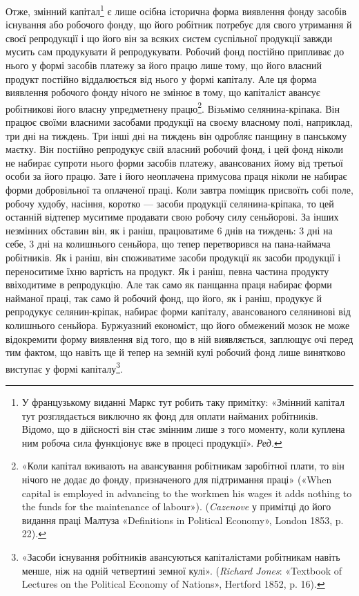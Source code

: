 Отже, змінний капітал\footnote*{
У французькому виданні Маркс тут робить таку примітку: «Змінний
капітал тут розглядається виключно як фонд для оплати найманих
робітників. Відомо, що в дійсності він стає змінним лише з того моменту,
коли куплена ним робоча сила функціонує вже в процесі продукції».
\emph{Ред.}
} є лише осібна історична форма виявлення
фонду засобів існування або робочого фонду, що його
робітник потребує для свого утримання й своєї репродукції і
що його він за всяких систем суспільної продукції завжди мусить
сам продукувати й репродукувати. Робочий фонд постійно
припливає до нього у формі засобів платежу за його працю лише
тому, що його власний продукт постійно віддалюється від нього
у формі капіталу. Але ця форма виявлення робочого фонду нічого
не змінює в тому, що капіталіст авансує робітникові його
власну упредметнену працю\footnote{
«Коли капітал вживають на авансування робітникам заробітної
плати, то він нічого не додає до фонду, призначеного для підтримання
праці» («When capital is employed in advancing to the workmen his wages
it adds nothing to the funds for the maintenance of labour»). (\emph{Cazenove}
у примітці до його видання праці Малтуза «Definitions in Political Economy»,
London 1853, p. 22).
}. Візьмімо селянина-кріпака. Він
працює своїми власними засобами продукції на своєму власному
полі, наприклад, три дні на тиждень. Три інші дні на тиждень
він одробляє панщину в панському маєтку. Він постійно репродукує
свій власний робочий фонд, і цей фонд ніколи не набирає
супроти нього форми засобів платежу, авансованих йому
від третьої особи за його працю. Зате і його неоплачена примусова
праця ніколи не набирає форми добровільної та оплаченої
праці. Коли завтра поміщик присвоїть собі поле, робочу худобу,
насіння, коротко — засоби продукції селянина-кріпака,
то цей останній відтепер муситиме продавати свою робочу силу
сеньйорові. За інших незмінних обставин він, як і раніш, працюватиме
6 днів на тиждень: 3 дні на себе, 3 дні на колишнього
сеньйора, що тепер перетворився на пана-наймача робітників.
Як і раніш, він споживатиме засоби продукції як засоби продукції
і переноситиме їхню вартість на продукт. Як і раніш, певна
частина продукту ввіходитиме в репродукцію. Але так само як
панщанна праця набирає форми найманої праці, так само й робочий
фонд, що його, як і раніш, продукує й репродукує селянин-кріпак,
набирає форми капіталу, авансованого селянинові від
колишнього сеньйора. Буржуазний економіст, що його обмежений
мозок не може відокремити форму виявлення від того, що
в ній виявляється, заплющує очі перед тим фактом, що навіть
ще й тепер на земній кулі робочий фонд лише винятково виступає
у формі капіталу\footnote{
«Засоби існування робітників авансуються капіталістами робітникам
навіть менше, ніж на одній четвертині земної кулі». (\emph{Richard
Jones}: «Textbook of Lectures on the Political Economy of Nations», Hertford
1852, p. 16).
}.


